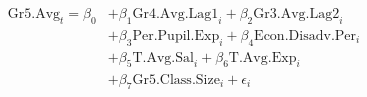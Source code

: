 \begin{align*}
\mathrm{Gr5.Avg}_{t} = \beta_{0}
    &+ \beta_{1}  \mathrm{Gr4.Avg.Lag1}_{i}
    + \beta_{2}  \mathrm{Gr3.Avg.Lag2}_{i}    \\
    &+ \beta_{3}  \mathrm{Per.Pupil.Exp}_{i}
    + \beta_{4}  \mathrm{Econ.Disadv.Per}_{i} \\
    &+ \beta_{5}  \mathrm{T.Avg.Sal}_{i}
    + \beta_{6}  \mathrm{T.Avg.Exp}_{i}  \\
    &+ \beta_{7}  \mathrm{Gr5.Class.Size}_{i} + \epsilon_{i}
\end{align*}
